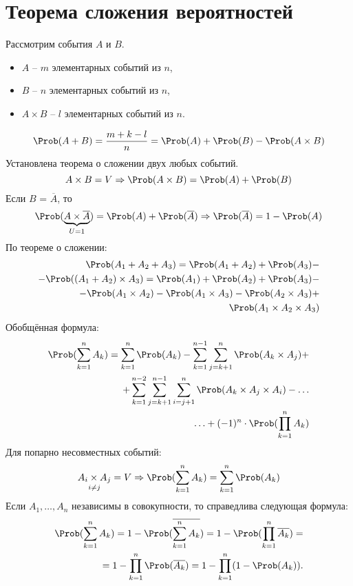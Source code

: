 \section{Теорема сложения вероятностей}
Рассмотрим события $A$ и $B$.
\begin{itemize}
  \item $A$ -- $m$ элементарных событий из $n$,
  \item $B$ -- $n$ элементарных событий из $n$,
  \item $A \times B$ -- $l$ элементарных событий из $n$.
\end{itemize}
\[
\Prob(A + B) = \frac{m + k - l}{n} = \Prob(A) + \Prob(B) - \Prob(A \times B)
\]
Установлена теорема о сложении двух любых событий.
\[
  A \times B = V \Rightarrow \Prob(A \times B) = \Prob(A) + \Prob(B)
\]
Если $B$ = $\overline{A}$, то
\[
  \Prob(\underbrace{A \times \overline{A}}_{U = 1}) = \Prob(A) + \Prob(\overline{A}) \Rightarrow \Prob(\overline{A}) = 1 - \Prob(A)
\]
По теореме о сложении:
\[
  \begin{split}
  \Prob(A_1 + A_2 + A_3) = \Prob(A_1 + A_2) + \Prob(A_3) - \\
  - \Prob((A_1 + A_2) \times A_3) = \Prob(A_1) + \Prob(A_2) + \Prob(A_3) - \\
  - \Prob(A_1 \times A_2) - \Prob(A_1 \times A_3) - \Prob(A_2 \times A_3) + \\ \Prob(A_1 \times A_2 \times A_3)
  \end{split}
\]
Обобщённая формула:
\[
  \begin{split}
    \Prob(\sum\limits_{k=1}^n A_k) = \sum\limits_{k=1}^n \Prob(A_k) - \sum\limits_{k=1}^{n-1} \sum\limits_{j=k+1}^n \Prob(A_k \times A_j) + \\
    + \sum\limits_{k=1}^{n-2} \sum\limits_{j=k+1}^{n-1} \sum\limits_{i=j+1}^n \Prob(A_k \times A_j \times A_i) - \ldots \\ \ldots + (-1)^n \cdot \Prob(\prod\limits_{k=1}^n A_k)
  \end{split}
\]
Для попарно несовместных событий:
\[
  \underset{i \not= j}{A_i \times A_j} = V \Rightarrow \Prob(\sum\limits_{k=1}^n A_k) = \sum\limits_{k=1}^n \Prob(A_k)
\]
Если $A_1, \dots, A_n$ независимы в совокупности, то справедлива следующая формула:
\[
\begin{split}
  \Prob(\sum\limits_{k=1}^n A_k) = 1 - \Prob(\overline{\sum\limits_{k=1}^n A_k}) = 1 - \Prob(\prod\limits_{k=1}^n \overline{A_k}) = \\
  = 1 - \prod\limits_{k=1}^n \Prob(\overline{A_k}) = 1 - \prod\limits_{k=1}^n(1 - \Prob(A_k)).
\end{split}
\]
